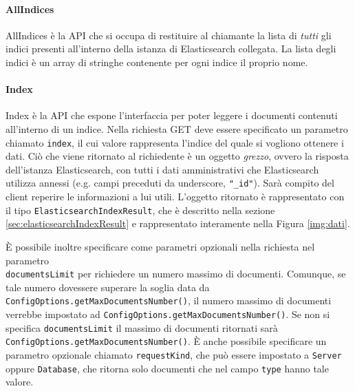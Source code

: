 \paragraph{AllIndices} \Spazio
AllIndices è la API che si occupa di restituire al chiamante la lista di \emph{tutti} gli indici presenti all'interno della istanza di Elasticsearch collegata. La lista degli indici è un array di stringhe contenente per ogni indice il proprio nome.

\paragraph{Index} \Spazio
Index è la API che espone l'interfaccia per poter leggere i documenti contenuti all'interno di un indice. Nella richiesta GET deve essere specificato un parametro chiamato \texttt{index}, il cui valore rappresenta l'indice del quale si vogliono ottenere i dati. Ciò che viene ritornato al richiedente è un oggetto \emph{grezzo}, ovvero la risposta dell'istanza Elasticsearch, con tutti i dati amministrativi che Elasticsearch utilizza annessi (e.g. campi preceduti da underscore, \texttt{"\_id"}). Sarà compito del client reperire le informazioni a lui utili. L'oggetto ritornato è rappresentato con il tipo \texttt{ElasticsearchIndexResult}, che è descritto nella sezione \ref{sec:elasticsearchIndexResult} e rappresentato interamente nella Figura \ref{img:dati}.

È possibile inoltre specificare come parametri opzionali nella richiesta nel parametro\\ \texttt{documentsLimit} per richiedere un numero massimo di documenti. Comunque, se tale numero dovessere superare la soglia data da \texttt{ConfigOptions.getMaxDocumentsNumber()}, il numero massimo di documenti verrebbe impostato ad \texttt{ConfigOptions.getMaxDocumentsNumber()}. Se non si specifica \texttt{documentsLimit} il massimo di documenti ritornati sarà\\ \texttt{ConfigOptions.getMaxDocumentsNumber()}.
È anche possibile specificare un parametro opzionale chiamato \texttt{requestKind}, che può essere impostato a \texttt{Server} oppure \texttt{Database}, che ritorna solo documenti che nel campo \texttt{type} hanno tale valore. 
